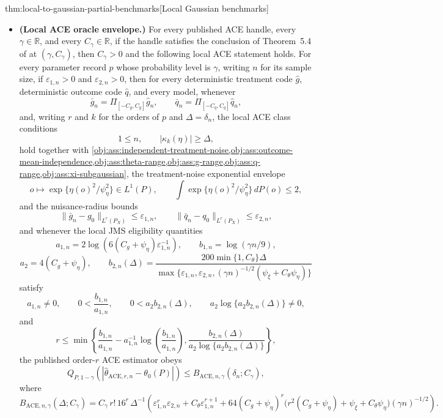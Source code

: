 \documentclass[11pt]{article}
\begin{document}
\begin{theoremv}{thm:local-to-gaussian-partial-benchmarks}[Local Gaussian benchmarks]
\begin{itemize}
\item \textbf{(Local ACE oracle envelope.)} For every published ACE handle, every \(\gamma\in\mathbb R\), and every \(C_{\gamma}\in\mathbb R\), if the handle satisfies the conclusion of Theorem~5.4 of \citet{JinMackeySyrgkanis2025} at \((\gamma,C_{\gamma})\), then \(C_{\gamma}>0\) and the following local ACE statement holds.  For every parameter record \(p\) whose probability level is \(\gamma\), writing \(n\) for its sample size, if \(\varepsilon_{1,n}>0\) and \(\varepsilon_{2,n}>0\), then for every deterministic treatment code \(\widehat g\), deterministic outcome code \(\widehat q\), and every model, whenever
\[
\bar g_n=\Pi_{[-C_g,C_g]}\widehat g_n,
\qquad
\bar q_n=\Pi_{[-C_q,C_q]}\widehat q_n,
\]
and, writing \(r\) and \(k\) for the orders of \(p\) and \(\Delta=\delta_n\), the local ACE class conditions
\[
1\le n,
\qquad
|\kappa_k(\eta)|\ge \Delta,
\]
hold together with \cref{obj:ass:independent-treatment-noise,obj:ass:outcome-mean-independence,obj:ass:theta-range,obj:ass:g-range,obj:ass:q-range,obj:ass:xi-subgaussian}, the treatment-noise exponential envelope
\[
o\mapsto \exp\{\eta(o)^2/\psi_{\eta}^2\}\in L^1(P),
\qquad
\int \exp\{\eta(o)^2/\psi_{\eta}^2\}\,dP(o)\le 2,
\]
and the nuisance-radius bounds
\[
\|\bar g_n-g_0\|_{L^r(P_X)}\le \varepsilon_{1,n},
\qquad
\|\bar q_n-q_0\|_{L^r(P_X)}\le \varepsilon_{2,n},
\]
and whenever the local JMS eligibility quantities
\[
a_{1,n}=2\log\!\left(6(C_g+\psi_{\eta})\varepsilon_{1,n}^{-1}\right),
\qquad
b_{1,n}=\log(\gamma n/9),
\]
\[
a_2=4(C_g+\psi_{\eta}),
\qquad
b_{2,n}(\Delta)=
\frac{200\min\{1,C_{\theta}\}\Delta}{\max\{\varepsilon_{1,n},\varepsilon_{2,n},(\gamma n)^{-1/2}(\psi_{\xi}+C_{\theta}\psi_{\eta})\}}
\]
satisfy
\[
a_{1,n}\ne0,
\qquad
0<\frac{b_{1,n}}{a_{1,n}},
\qquad
0<a_2b_{2,n}(\Delta),
\qquad
a_2\log\{a_2b_{2,n}(\Delta)\}\ne0,
\]
and
\[
r\le
\min\left\{
\frac{b_{1,n}}{a_{1,n}}-a_{1,n}^{-1}\log\!\left(\frac{b_{1,n}}{a_{1,n}}\right),
\frac{b_{2,n}(\Delta)}{a_2\log\{a_2b_{2,n}(\Delta)\}}
\right\},
\]
the published order-\(r\) ACE estimator obeys
\[
Q_{P,1-\gamma}
\!\left(\left|\widehat\theta_{\mathrm{ACE},r,n}-\theta_0(P)\right|\right)
\le
B_{\mathrm{ACE},n,\gamma}(\delta_n;C_{\gamma}),
\]
where
\[
B_{\mathrm{ACE},n,\gamma}(\Delta;C_{\gamma})
=
C_{\gamma}\,r!\,16^r\,\Delta^{-1}
\left(
\varepsilon_{1,n}^r\varepsilon_{2,n}
+C_{\theta}\varepsilon_{1,n}^{r+1}
+64(C_g+\psi_{\eta})^r
\bigl(r^2(C_g+\psi_{\eta})+\psi_{\xi}+C_{\theta}\psi_{\eta}\bigr)
(\gamma n)^{-1/2}
\right).
\]
\end{itemize}
\end{theoremv}
\end{document}
